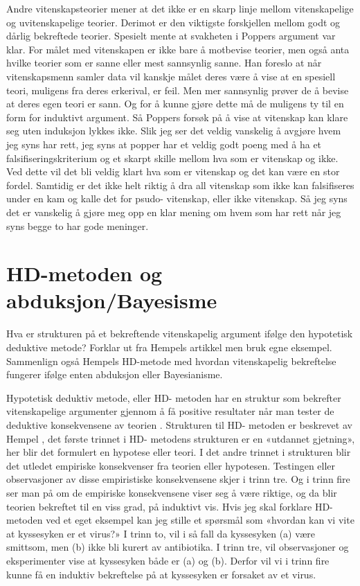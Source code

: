 \documentclass[
]{book}
\begin{document}
Andre vitenskapsteorier mener at det ikke er en skarp linje mellom vitenskapelige og uvitenskapelige teorier.
Derimot er den viktigste forskjellen mellom godt og dårlig bekreftede teorier.
Spesielt \citet{okasha2016} mente at svakheten i Poppers argument var klar.
For målet med vitenskapen er ikke bare å motbevise teorier, men også anta hvilke teorier som er sanne eller mest sannsynlig sanne.
Han foreslo at når vitenskapsmenn samler data vil kanskje målet deres være å vise at en spesiell teori, muligens fra deres erkerival, er feil.
Men mer sannsynlig prøver de å bevise at deres egen teori er sann.
Og for å kunne gjøre dette må de muligens ty til en form for induktivt argument.
Så Poppers forsøk på å vise at vitenskap kan klare seg uten induksjon lykkes ikke.
Slik jeg ser det veldig vanskelig å avgjøre hvem jeg syns har rett, jeg syns at popper har et veldig godt poeng med å ha et falsifiseringskriterium og et skarpt skille mellom hva som er vitenskap og ikke.
Ved dette vil det bli veldig klart hva som er vitenskap og det kan være en stor fordel.
Samtidig er det ikke helt riktig å dra all vitenskap som ikke kan falsifiseres under en kam og kalle det for psudo- vitenskap, eller ikke vitenskap.
Så jeg syns det er vanskelig å gjøre meg opp en klar mening om hvem som har rett når jeg syns begge to har gode meninger.

\hypertarget{hd-metoden-og-abduksjonbayesisme}{%
\section{HD-metoden og abduksjon/Bayesisme}\label{hd-metoden-og-abduksjonbayesisme}}

Hva er strukturen på et bekreftende vitenskapelig argument ifølge den hypotetisk deduktive metode?
Forklar ut fra Hempels artikkel men bruk egne eksempel.
Sammenlign også Hempels HD-metode med hvordan vitenskapelig bekreftelse fungerer ifølge enten abduksjon eller Bayesianisme.

Hypotetisk deduktiv metode, eller HD- metoden har en struktur som bekrefter vitenskapelige argumenter gjennom å få positive resultater når man tester de deduktive konsekvensene av teorien \citet{hempel1966}.
Strukturen til HD- metoden er beskrevet av Hempel \citet{hempel1966}, det første trinnet i HD- metodens strukturen er en «utdannet gjetning», her blir det formulert en hypotese eller teori.
I det andre trinnet i strukturen blir det utledet empiriske konsekvenser fra teorien eller hypotesen.
Testingen eller observasjoner av disse empiristiske konsekvensene skjer i trinn tre.
Og i trinn fire ser man på om de empiriske konsekvensene viser seg å være riktige, og da blir teorien bekreftet til en viss grad, på induktivt vis.
Hvis jeg skal forklare HD- metoden ved et eget eksempel kan jeg stille et spørsmål som «hvordan kan vi vite at kyssesyken er et virus?»
I trinn to, vil i så fall da kyssesyken (a) være smittsom, men (b) ikke bli kurert av antibiotika.
I trinn tre, vil observasjoner og eksperimenter vise at kyssesyken både er (a) og (b).
Derfor vil vi i trinn fire kunne få en induktiv bekreftelse på at kyssesyken er forsaket av et virus.
\end{document}
